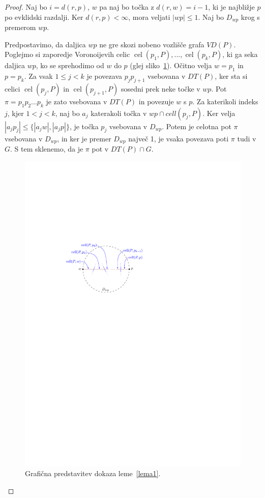\documentclass[a4paper, 12pt]{book}
\begin{document}
\begin{proof}
Naj bo $i = d(r,p)$, $w$ pa naj bo točka z $d(r,w) = i - 1$, ki je najbližje $p$ po evklidski razdalji. Ker $d(r,p) < \infty$, mora veljati $|wp| \leq 1$. Naj bo $D_{wp}$ krog s premerom $wp$.

Predpostavimo, da daljica $wp$ ne gre skozi nobeno vozlišče grafa $VD(P)$. Poglejmo si zaporedje Voronoijevih celic $\operatorname{cel}(p_1, P),..., \operatorname{cel}(p_k, P)$, ki ga seka daljica $wp$, ko se sprehodimo od $w$ do $p$ (glej sliko~\ref{c1c2}). Očitno velja $w = p_1$ in $p = p_k$. Za vsak $1 \leq j < k$ je povezava $p_jp_{j+1}$ vsebovana v $DT(P)$, ker sta si celici $\operatorname{cel}(p_j, P)$ in $\operatorname{cel}(p_{j+1}, P)$ sosedni prek neke točke v $wp$. Pot $\pi = p_1p_2...p_k$ je zato vsebovana v $DT(P)$ in povezuje $w$ s $p$. Za katerikoli indeks $j$, kjer $1 < j < k$, naj bo $a_j$ katerakoli točka v $wp \cap cell(p_j, P)$. Ker velja $|a_jp_j| \leq \{|a_jw|, |a_jp|\}$, je točka $p_j$ vsebovana v $D_{wp}$. Potem je celotna pot $\pi$ vsebovana v $D_{wp}$, in ker je premer $D_{wp}$ največ 1, je vsaka povezava poti $\pi$ tudi v $G$. S tem sklenemo, da je $\pi$ pot v $DT(P) \cap G$.

\begin{figure}[htp]
\centerline{\includegraphics[scale=1]{pics/path.pdf}}
\caption{Grafična predstavitev dokaza leme~\ref{lema1}.}
\label{c1c2}
\end{figure}


\end{proof}
\end{document}
